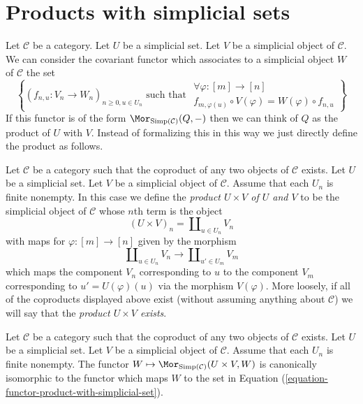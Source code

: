 \section{Products with simplicial sets}
\label{section-product-with-simplicial-sets}

\noindent
Let $\mathcal{C}$ be a category.
Let $U$ be a simplicial set.
Let $V$ be a simplicial object of $\mathcal{C}$.
We can consider the covariant functor which associates
to a simplicial object $W$ of $\mathcal{C}$
the set
\begin{equation}
\label{equation-functor-product-with-simplicial-set}
\left\{
(f_{n, u} : V_n \to W_n)_{n \geq 0, u \in U_n}
\text{ such that }
\begin{matrix}
\forall \varphi : [m] \to [n] \\
f_{m, \varphi(u)} \circ V(\varphi) = W(\varphi) \circ f_{n, u}
\end{matrix}
\right\}
\end{equation}
If this functor is of the form
$\Mor_{\text{Simp}(\mathcal{C})}(Q, -)$
then we can think of $Q$ as the product of $U$ with $V$.
Instead of formalizing this in this way we just directly
define the product as follows.

\begin{definition}
\label{definition-product-with-simplicial-set}
Let $\mathcal{C}$ be a category such that the coproduct of
any two objects of $\mathcal{C}$ exists. Let
$U$ be a simplicial set. Let $V$ be a simplicial
object of $\mathcal{C}$. Assume that each $U_n$ is
finite nonempty. In this case we define
the {\it product $U \times V$ of $U$ and $V$}
to be the simplicial object of $\mathcal{C}$ whose
$n$th term is the object
$$
(U \times V)_n = \coprod\nolimits_{u\in U_n} V_n
$$
with maps for $\varphi : [m] \to [n]$ given by the
morphism
$$
\coprod\nolimits_{u\in U_n} V_n
\longrightarrow
\coprod\nolimits_{u'\in U_m} V_m
$$
which maps the component $V_n$ corresponding to $u$ to the
component $V_m$ corresponding to $u' = U(\varphi)(u)$
via the morphism $V(\varphi)$.
More loosely, if all of the coproducts displayed above
exist (without assuming anything about $\mathcal{C}$)
we will say that the {\it product $U \times V$ exists}.
\end{definition}

\begin{lemma}
\label{lemma-check-product-with-simplicial-set}
Let $\mathcal{C}$ be a category such that the coproduct of
any two objects of $\mathcal{C}$ exists. Let
$U$ be a simplicial set. Let $V$ be a simplicial
object of $\mathcal{C}$. Assume that each $U_n$ is
finite nonempty. The functor
$W \mapsto \Mor_{\text{Simp}(\mathcal{C})}(U \times V, W)$
is canonically isomorphic to the functor which
maps $W$ to the set in
Equation (\ref{equation-functor-product-with-simplicial-set}).
\end{lemma}

